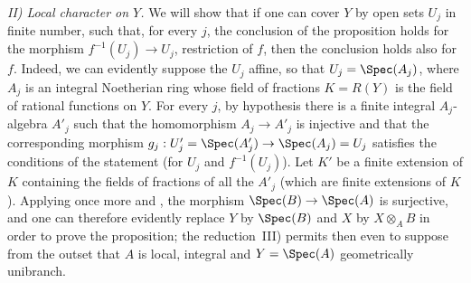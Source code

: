 \emph{II) Local character on $Y$.}
We will show that if one can cover $Y$ by open sets $U_j$ in finite number, such that, for every $j$, the conclusion of the proposition holds for the morphism $f^{-1}(U_j)\to U_j$, restriction of $f$, then the conclusion holds also for $f$.
Indeed, we can evidently suppose the $U_j$ affine, so that $U_j=\Spec(A_j)$, where $A_j$ is an integral Noetherian ring whose field of fractions $K=R(Y)$ is the field of rational functions on $Y$.
For every $j$, by hypothesis there is a finite integral $A_j$-algebra $A'_j$ such that the homomorphism $A_j\to A'_j$ is injective  and that the corresponding morphism $g_j:U'_j=\Spec(A'_j)\to\Spec(A_j)=U_j$ satisfies the conditions of the statement (for $U_j$ and $f^{-1}(U_j)$).
Let $K'$ be a finite extension of $K$ containing the fields of fractions of all the $A'_j$ (which are finite extensions of $K$).
Applying once more  and , the morphism $\Spec(B)\to\Spec(A)$ is surjective, and one can therefore evidently replace $Y$ by $\Spec(B)$ and $X$ by $X\otimes_A B$ in order to prove the proposition; the reduction~III) permits then even to suppose from the outset that $A$ is local, integral and $Y=\Spec(A)$ geometrically unibranch.

